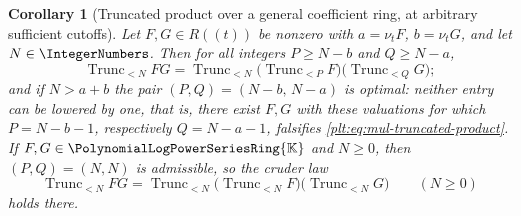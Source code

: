 \documentclass[11pt,oneside]{article}
\theoremstyle{plain}
\newtheorem{corollary}[theorem]{Corollary}
\theoremstyle{definition}
\theoremstyle{remark}
\newcommand{\K}{\mathbb{K}}
\newcommand{\PLpow}{\PolynomialLogPowerSeriesRing{\K}}   %
\newcommand{\PLlau}{\PolynomialLogLaurentRing{\K}}       %
\newcommand{\ordt}{\nu_{t}}                              %
\newcommand{\Trunc}[2]{\operatorname{Trunc}_{<#2}#1}     %
\begin{document}
\begin{corollary}[Truncated product over a general coefficient ring, at
arbitrary sufficient cutoffs]
\label{plt:cor:mul-truncated-product}
Let $F,G\in R((t))$ be nonzero with $a=\ordt F$, $b=\ordt G$, and let
$N\in\IntegerNumbers$.  Then for all integers $P\ge N-b$ and $Q\ge N-a$,
\begin{equation}\label{plt:eq:mul-truncated-product}
 \Trunc{FG}{N}
 =\Trunc{\bigl(\Trunc{F}{P}\bigr)\bigl(\Trunc{G}{Q}\bigr)}{N};
\end{equation}
and if $N>a+b$ the pair $(P,Q)=(N-b,\,N-a)$ is optimal: neither entry can be
lowered by one, that is, there exist $F,G$ with these valuations
for which $P=N-b-1$, respectively $Q=N-a-1$, falsifies
\eqref{plt:eq:mul-truncated-product}.  If $F,G\in\PLpow$ and $N\ge0$, then
$(P,Q)=(N,N)$ is admissible, so the cruder law
\begin{equation}\label{plt:eq:mul-truncated-product-crude}
 \Trunc{FG}{N}=\Trunc{\bigl(\Trunc{F}{N}\bigr)\bigl(\Trunc{G}{N}\bigr)}{N}
 \qquad(N\ge0)
\end{equation}
holds there.
\end{corollary}
\end{document}
